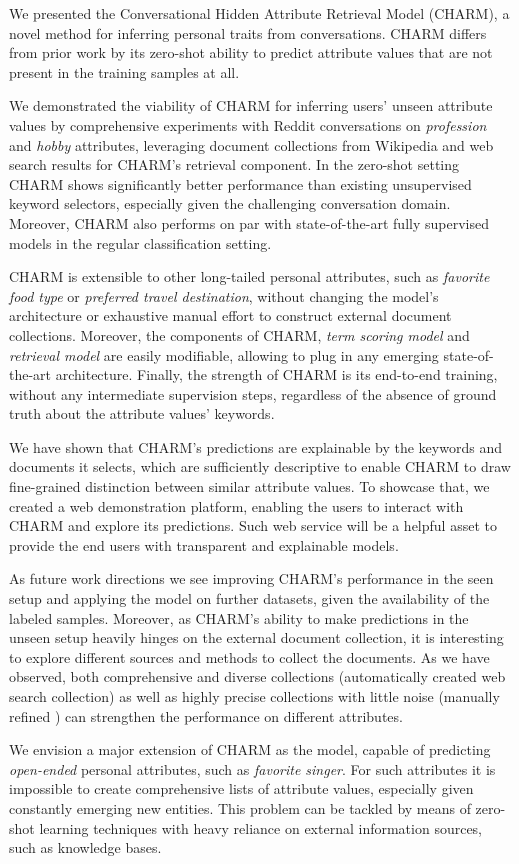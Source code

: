 We presented the 
Conversational 
Hidden 
Attribute 
Retrieval 
Model (CHARM), a novel method 
for inferring personal traits from conversations. CHARM differs from prior
work by its zero-shot ability to
predict attribute values 
that are not present in the training samples
at all.

We demonstrated 
the viability of CHARM
for inferring users' unseen attribute values
by comprehensive 
experiments with Reddit conversations on \textit{profession} and \textit{hobby} attributes,
leveraging document collections from Wikipedia and web search results
for CHARM's retrieval component.
In the zero-shot setting CHARM shows significantly better performance than existing unsupervised keyword selectors, especially given the challenging conversation domain. Moreover, CHARM also performs on par with state-of-the-art fully supervised models in the regular classification setting.

CHARM is extensible to other long-tailed personal attributes, such as \textit{favorite food type} or \textit{preferred travel destination}, without changing the model's architecture or exhaustive manual effort to construct external document collections. Moreover, the components of CHARM, \textit{term scoring model} and \textit{retrieval model} are easily modifiable, allowing to plug in any emerging state-of-the-art architecture. Finally, the strength of CHARM is its end-to-end training, without any intermediate supervision steps, regardless of the absence of ground truth about the attribute values' keywords.

We have shown that CHARM's predictions are explainable by the keywords and documents it selects, which are sufficiently descriptive to enable CHARM to draw fine-grained distinction between similar attribute values. To showcase that, we created a web demonstration platform, enabling the users to interact with CHARM and explore its predictions. Such web service will be a helpful asset to provide the end users with transparent and explainable models. 

As future work directions we see improving CHARM's performance in the seen setup and applying the model on further datasets, given the availability of the labeled samples. Moreover, as CHARM's ability to make predictions in the unseen setup heavily hinges on the external document collection, it is interesting to explore different sources and methods to collect the documents. As we have observed, both comprehensive and diverse collections (automatically created web search collection) as well as highly precise collections with little noise (manually refined ) can strengthen the performance on different attributes.

We envision a major extension of CHARM as the model, capable of predicting \textit{open-ended} personal attributes, such as \textit{favorite singer}. For such attributes it is impossible to create comprehensive lists of attribute values, especially given constantly emerging new entities. This problem can be tackled by means of zero-shot learning techniques with heavy reliance on external information sources, such as knowledge bases.